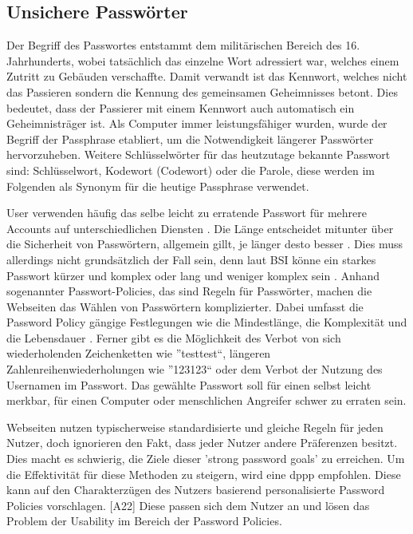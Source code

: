 \subsection{Unsichere Passwörter}
Der Begriff des Passwortes entstammt dem militärischen Bereich des 16. Jahrhunderts, wobei tatsächlich das einzelne Wort adressiert war, welches einem Zutritt zu Gebäuden verschaffte. Damit verwandt ist das Kennwort, welches nicht das Passieren sondern die Kennung des gemeinsamen Geheimnisses betont. Dies bedeutet, dass der Passierer mit einem Kennwort auch automatisch ein Geheimnisträger ist. Als Computer immer leistungsfähiger wurden, wurde der Begriff der Passphrase etabliert, um die Notwendigkeit längerer Passwörter hervorzuheben. Weitere Schlüsselwörter für das heutzutage bekannte Passwort sind: Schlüsselwort, Kodewort (Codewort) oder die Parole, diese werden im Folgenden als Synonym für die heutige Passphrase verwendet.

User verwenden häufig das selbe leicht zu erratende Passwort für mehrere Accounts auf unterschiedlichen Diensten \cite{A3}. Die Länge entscheidet mitunter über die Sicherheit von Passwörtern, allgemein gillt, je länger desto besser \cite{A4}. Dies muss allerdings nicht grundsätzlich der Fall sein, denn laut BSI könne ein starkes Passwort kürzer und komplex oder lang und weniger komplex sein \cite{A4}. Anhand sogenannter Passwort-Policies, das sind Regeln für Passwörter, machen die Webseiten das Wählen von Passwörtern komplizierter. Dabei umfasst die Password Policy gängige Festlegungen wie die Mindestlänge, die Komplexität und die Lebensdauer \cite{A3}. Ferner gibt es die Möglichkeit des Verbot von sich wiederholenden Zeichenketten wie ''testtest``, längeren Zahlenreihenwiederholungen wie ''123123`` oder dem Verbot der Nutzung des Usernamen im Passwort. Das gewählte Passwort soll für einen selbst leicht merkbar, für einen Computer oder menschlichen Angreifer schwer zu erraten sein.

Webseiten nutzen typischerweise standardisierte und gleiche Regeln für jeden Nutzer, doch ignorieren den Fakt, dass jeder Nutzer andere Präferenzen besitzt. Dies macht es schwierig, die Ziele dieser 'strong password goals' zu erreichen. Um die Effektivität für diese Methoden zu steigern, wird eine \ac{dppp} empfohlen. Diese kann auf den Charakterzügen des Nutzers basierend personalisierte Password Policies vorschlagen. [A22] Diese passen sich dem Nutzer an und lösen das Problem der Usability im Bereich der Password Policies.
\newpage

